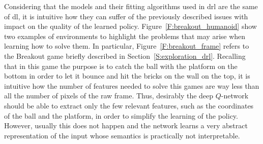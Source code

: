 Considering that the models and their fitting algorithms used in \gls{drl} are the same of \gls{dl}, it is intuitive how they can suffer of the previously described issues with impact on the quality of the learned policy. Figure~\ref{F:breakout_humanoid} show two examples of environments to highlight the problems that may arise when learning how to solve them. In particular, Figure~\ref{F:breakout_frame} refers to the Breakout game briefly described in Section~\ref{S:exploration_drl}. Recalling that in this game the purpose is to catch the ball with the platform on the bottom in order to let it bounce and hit the bricks on the wall on the top, it is intuitive how the number of features needed to solve this games are way less than all the number of pixels of the raw frame. Thus, desirably the deep $Q$-network should be able to extract only the few relevant features, such as the coordinates of the ball and the platform, in order to simplify the learning of the policy. However, usually this does not happen and the network learns a very abstract representation of the input whose semantics is practically not interpretable.
